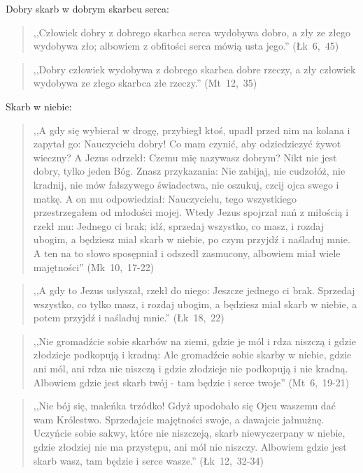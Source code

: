 \documentclass[10pt,a4paper,oneside]{article}
\begin{document}
Dobry skarb w dobrym skarbcu serca:
\begin{quote}
,,Człowiek dobry z dobrego skarbca serca wydobywa dobro, a zły ze złego wydobywa zło; albowiem z obfitości serca mówią usta jego.'' \mbox{(Łk 6, 45)}
\end{quote}
\begin{quote}
,,Dobry człowiek wydobywa z dobrego skarbca dobre rzeczy, a zły człowiek wydobywa ze złego skarbca złe rzeczy.'' \mbox{(Mt 12, 35)}
\end{quote}

Skarb w niebie:
\begin{quote}
,,A gdy się wybierał w drogę, przybiegł ktoś, upadł przed nim na kolana i zapytał go: Nauczycielu dobry! Co mam czynić, aby odziedziczyć żywot wieczny? A Jezus odrzekł: Czemu mię nazywasz dobrym? Nikt nie jest dobry, tylko jeden Bóg. Znasz przykazania: Nie zabijaj, nie cudzołóż, nie kradnij, nie mów fałszywego świadectwa, nie oszukuj, czcij ojca swego i matkę. A on mu odpowiedział: Nauczycielu, tego wszystkiego przestrzegałem od młodości mojej. Wtedy Jezus spojrzał nań z miłością i rzekł mu: Jednego ci brak; idź, sprzedaj wszystko, co masz, i rozdaj ubogim, a będziesz miał skarb w niebie, po czym przyjdź i naśladuj mnie. A ten na to słowo sposępniał i odszedł zasmucony, albowiem miał wiele majętności'' \mbox{(Mk 10, 17-22)}
\end{quote}
\begin{quote}
,,A gdy to Jezus usłyszał, rzekł do niego: Jeszcze jednego ci brak. Sprzedaj wszystko, co tylko masz, i rozdaj ubogim, a będziesz miał skarb w niebie, a potem przyjdź i naśladuj mnie.'' \mbox{(Łk 18, 22)}
\end{quote}
\begin{quote}
,,Nie gromadźcie sobie skarbów na ziemi, gdzie je mól i rdza niszczą i gdzie złodzieje podkopują i kradną: Ale gromadźcie sobie skarby w niebie, gdzie ani mól, ani rdza nie niszczą i gdzie złodzieje nie podkopują i nie kradną. Albowiem gdzie jest skarb twój - tam będzie i serce twoje'' \mbox{(Mt 6, 19-21)}
\end{quote}
\begin{quote}
,,Nie bój się, maleńka trzódko! Gdyż upodobało się Ojcu waszemu dać wam Królestwo. Sprzedajcie majętności swoje, a dawajcie jałmużnę. Uczyńcie sobie sakwy, które nie niszczeją, skarb niewyczerpany w niebie, gdzie złodziej nie ma przystępu, ani mól nie niszczy. Albowiem gdzie jest skarb wasz, tam będzie i serce wasze.'' \mbox{(Łk 12, 32-34)}
\end{quote}
\end{document}
